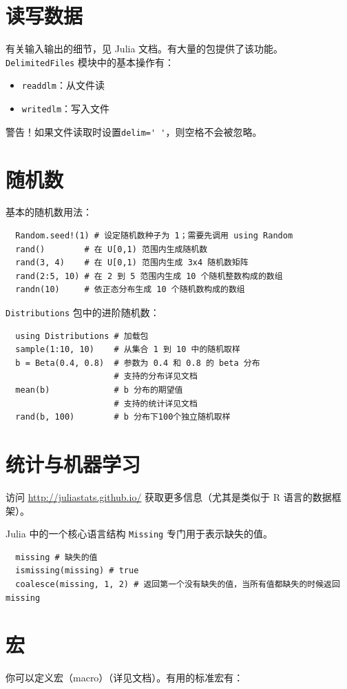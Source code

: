 \documentclass[10pt,a4paper]{article}
\begin{document}
\section{读写数据}
有关输入输出的细节，见 Julia 文档。有大量的包提供了该功能。
\lstinline|DelimitedFiles| 模块中的基本操作有：
\begin{itemize}
  \item \lstinline|readdlm|：从文件读
  \item \lstinline|writedlm|：写入文件
\end{itemize}

警告！如果文件读取时设置\lstinline|delim=' '|，则空格不会被忽略。

\section{随机数}
基本的随机数用法：
\begin{lstlisting}
  Random.seed!(1) # 设定随机数种子为 1；需要先调用 using Random
  rand()        # 在 U[0,1) 范围内生成随机数
  rand(3, 4)    # 在 U[0,1) 范围内生成 3x4 随机数矩阵
  rand(2:5, 10) # 在 2 到 5 范围内生成 10 个随机整数构成的数组
  randn(10)     # 依正态分布生成 10 个随机数构成的数组
\end{lstlisting}

\lstinline|Distributions| 包中的进阶随机数：
\begin{lstlisting}
  using Distributions # 加载包
  sample(1:10, 10)    # 从集合 1 到 10 中的随机取样
  b = Beta(0.4, 0.8)  # 参数为 0.4 和 0.8 的 beta 分布
                      # 支持的分布详见文档
  mean(b)             # b 分布的期望值
                      # 支持的统计详见文档
  rand(b, 100)        # b 分布下100个独立随机取样
\end{lstlisting}

\section{统计与机器学习}
访问 \url{http://juliastats.github.io/} 获取更多信息（尤其是类似于 R 语言的数据框架）。

Julia 中的一个核心语言结构 \lstinline|Missing| 专门用于表示缺失的值。
\begin{lstlisting}
  missing # 缺失的值
  ismissing(missing) # true
  coalesce(missing, 1, 2) # 返回第一个没有缺失的值，当所有值都缺失的时候返回 missing
\end{lstlisting}

\section{宏}
你可以定义宏（macro）（详见文档）。有用的标准宏有：
\end{document}
